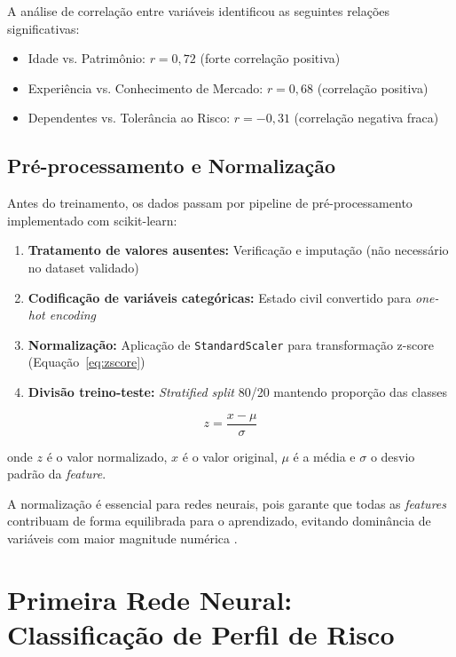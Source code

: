 A análise de correlação entre variáveis identificou as seguintes relações significativas:
\begin{itemize}
    \item Idade vs. Patrimônio: $r = 0,72$ (forte correlação positiva)
    \item Experiência vs. Conhecimento de Mercado: $r = 0,68$ (correlação positiva)
    \item Dependentes vs. Tolerância ao Risco: $r = -0,31$ (correlação negativa fraca)
\end{itemize}

\subsection{Pré-processamento e Normalização}

Antes do treinamento, os dados passam por pipeline de pré-processamento implementado com scikit-learn:

\begin{enumerate}
    \item \textbf{Tratamento de valores ausentes:} Verificação e imputação (não necessário no dataset validado)
    \item \textbf{Codificação de variáveis categóricas:} Estado civil convertido para \textit{one-hot encoding}
    \item \textbf{Normalização:} Aplicação de \texttt{StandardScaler} para transformação z-score (Equação~\ref{eq:zscore})
    \item \textbf{Divisão treino-teste:} \textit{Stratified split} 80/20 mantendo proporção das classes
\end{enumerate}

\begin{equation}
\label{eq:zscore}
z = \frac{x - \mu}{\sigma}
\end{equation}

onde $z$ é o valor normalizado, $x$ é o valor original, $\mu$ é a média e $\sigma$ o desvio padrão da \textit{feature}.

A normalização é essencial para redes neurais, pois garante que todas as \textit{features} contribuam de forma equilibrada para o aprendizado, evitando dominância de variáveis com maior magnitude numérica \cite{lecun2012efficient}.

\section{Primeira Rede Neural: Classificação de Perfil de Risco}

